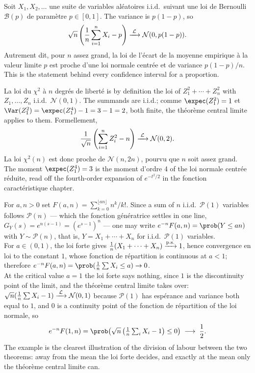 \begin{example}
  Soit $X_{1}, X_{2}, \dots$ une suite de variables aléatoires i.i.d.\ suivant
  une loi de Bernoulli $\mathcal{B}(p)$ de paramètre
  $p \in [0,1]$. The variance is $p(1-p)$, so
  \[
    \sqrt{n}\left(\frac{1}{n}\sum_{i=1}^{n} X_{i} - p\right)
      \xrightarrow{\;\mathcal{L}\;} \mathcal{N}(0, p(1-p)) .
  \]
  Autrement dit, pour $n$ assez grand, la loi de l'écart de la moyenne
  empirique à la valeur limite $p$ est proche d'une loi normale centrée et de
  variance $p(1-p)/n$.
  This is the statement behind every confidence interval for a proportion.
\end{example}

\begin{example}
  La loi du $\chi^{2}$ à $n$ degrés de liberté is by definition the loi of
  $Z_{1}^{2} + \cdots + Z_{n}^{2}$ with $Z_{1}, \dots, Z_{n}$ i.i.d.\
  $\mathcal{N}(0,1)$. The summands are i.i.d.; comme
  $\expec(Z_{1}^{2}) = 1$ et
  $\Var(Z_{1}^{2}) = \expec(Z_{1}^{4}) - 1 = 3 - 1 = 2$, both finite, the
  théorème central limite applies to them. Formellement,
  \[
    \frac{1}{\sqrt{n}}\left(\sum_{i=1}^{n} Z_{i}^{2} - n\right)
      \xrightarrow{\;\mathcal{L}\;} \mathcal{N}(0,2) .
  \]
  La loi $\chi^{2}(n)$ est donc proche de $\mathcal{N}(n, 2n)$, pourvu que $n$
  soit assez grand. The moment $\expec(Z_{1}^{4}) = 3$ is the moment d'ordre 4
  of the loi normale centrée réduite, read off the fourth-order expansion of
  $e^{-t^{2}/2}$ in the fonction caractéristique chapter.
\end{example}

\begin{example}
  For $a, n > 0$ set $F(a,n) = \sum_{k=0}^{\lfloor an \rfloor} n^{k}/k!$. Since
  a sum of $n$ i.i.d.\ $\mathcal{P}(1)$ variables follows $\mathcal{P}(n)$ ---
  which the fonction génératrice settles in one line, $G_{Y}(s) = e^{n(s-1)} =
  (e^{s-1})^{n}$ --- one may write $e^{-n}F(a,n) = \prob(Y \leq an)$ with
  $Y \sim \mathcal{P}(n)$, that is, $Y = X_{1} + \cdots + X_{n}$ for i.i.d.\
  $\mathcal{P}(1)$ variables.\\
  For $a \in (0,1)$, the loi forte gives
  $\frac{1}{n}(X_{1} + \cdots + X_{n}) \xrightarrow{\text{p.s.}} 1$, hence convergence en loi to
  the constant $1$, whose fonction de répartition is continuous at
  $a < 1$; therefore $e^{-n}F(a,n) = \prob(\frac{1}{n}\sum X_{i} \leq a) \to 0$.\\
  At the critical value $a = 1$ the loi forte says nothing, since $1$ is the
  discontinuity point of the limit, and the théorème central limite takes over:
  $\sqrt{n}(\frac{1}{n}\sum X_{i} - 1) \xrightarrow{\;\mathcal{L}\;} \mathcal{N}(0,1)$ because
  $\mathcal{P}(1)$ has espérance and variance both equal to $1$, and $0$ is a
  continuity point of the fonction de répartition of the loi normale, so
  \[
    e^{-n}F(1,n) = \prob\!\left(\sqrt{n}\left(\tfrac{1}{n}\textstyle\sum_{i} X_{i}
      - 1\right) \leq 0\right) \; \longrightarrow \; \frac{1}{2} .
  \]
  The example is the clearest illustration of the division of labour between the
  two theorems: away from the mean the loi forte decides, and exactly at the
  mean only the théorème central limite can.
\end{example}

